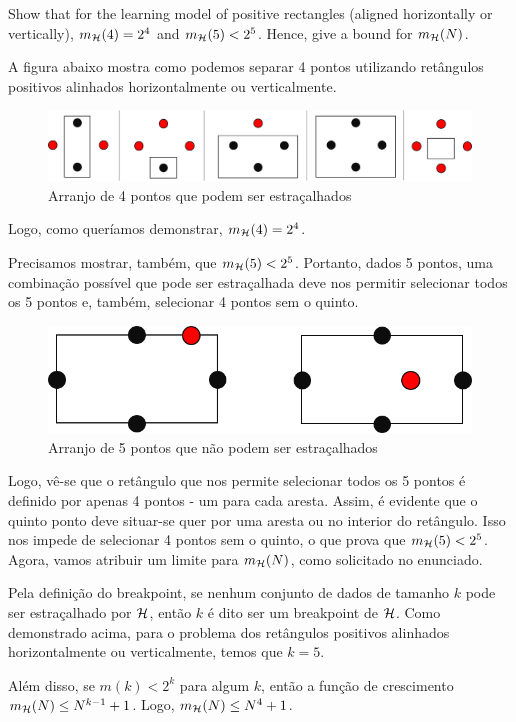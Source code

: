 \begin{enunciado}{2}
    Show that for the learning model of positive rectangles (aligned horizontally or vertically), $m_{\mathcal{H}}(4) = 2^4$ and $m_{\mathcal{H}}(5) < 2^5$. Hence, give a bound for $m_{\mathcal{H}}(N)$.
\end{enunciado}

A figura abaixo mostra como podemos separar 4 pontos utilizando retângulos positivos alinhados horizontalmente ou verticalmente.

\begin{figure}[h]
	\centering
	\begin{minipage}{0.46\textwidth}
		\centering
		\includegraphics[width=\textwidth]{images/2-2-dvc4.png}
		\caption{Arranjo de 4 pontos que podem ser estraçalhados}
	\end{minipage}
\end{figure}

Logo, como queríamos demonstrar, $m_{\mathcal{H}}(4) = 2^4$.


Precisamos mostrar, também, que $m_{\mathcal{H}}(5) < 2^5$.
Portanto, dados 5 pontos, uma combinação possível que pode ser estraçalhada deve nos permitir selecionar todos os 5 pontos
e, também, selecionar 4 pontos sem o quinto.

\begin{figure}[h]
	\centering
	\begin{minipage}{0.45\textwidth}
		\centering
		\includegraphics[width=\textwidth]{images/2-2-dvc5.png}
		\caption{Arranjo de 5 pontos que não podem ser estraçalhados}
	\end{minipage}
\end{figure}

Logo, vê-se que o retângulo que nos permite selecionar todos os 5 pontos é definido por apenas 4 pontos
- um para cada aresta. Assim, é evidente que o quinto ponto deve situar-se quer por uma aresta ou no interior do
retângulo. Isso nos impede de selecionar 4 pontos sem o quinto, o que prova que $m_{\mathcal{H}}(5) < 2^5$.\\

Agora, vamos atribuir um limite para $m_{\mathcal{H}}(N)$, como solicitado no enunciado.

Pela definição do breakpoint, se nenhum conjunto de dados de tamanho $k$ pode ser estraçalhado por ${\mathcal{H}}$, então $k$ é dito
ser um breakpoint de ${\mathcal{H}}$. Como demonstrado acima, para o problema dos retângulos positivos alinhados 
horizontalmente ou verticalmente, temos que $k = 5$.

Além disso, se $m(k)<2^k$ para algum $k$, então a função de crescimento $m_{\mathcal{H}}(N) \le N^{k-1} + 1$.
Logo, $m_{\mathcal{H}}(N) \le N^4+1$.